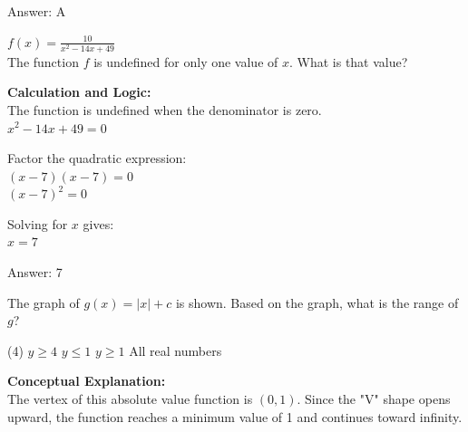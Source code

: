 \documentclass[11pt,paper=a4,answers]{exam}
\begin{document}
\begin{questions}
\begin{solution}
Answer: \colorbox{yellow!100}{A}
\end{solution}

\vspace{40pt}

\question
$f(x) = \frac{10}{x^2 - 14x + 49}$ \\
The function $f$ is undefined for only one value of $x$. What is that value?

\begin{solution}
\textbf{Calculation and Logic:} \\
The function is undefined when the denominator is zero. \\
$x^2 - 14x + 49 = 0$

\vspace{15pt}

Factor the quadratic expression: \\
$(x - 7)(x - 7) = 0$ \\
$(x - 7)^2 = 0$

\vspace{15pt}

Solving for $x$ gives: \\
$x = 7$

\vspace{30pt}

Answer: \colorbox{yellow!100}{7}
\end{solution}

\vspace{40pt}

\question
\begin{center}
\end{center}
The graph of $g(x) = |x| + c$ is shown. Based on the graph, what is the range of $g$?
\begin{tasks}(4)
    \task $y \geq 4$
    \task $y \leq 1$
    \task $y \geq 1$
    \task All real numbers
\end{tasks}

\begin{solution}
\textbf{Conceptual Explanation:} \\
The vertex of this absolute value function is $(0, 1)$. Since the "V" shape opens upward, the function reaches a minimum value of 1 and continues toward infinity.


\end{solution}
\end{questions}
\end{document}
